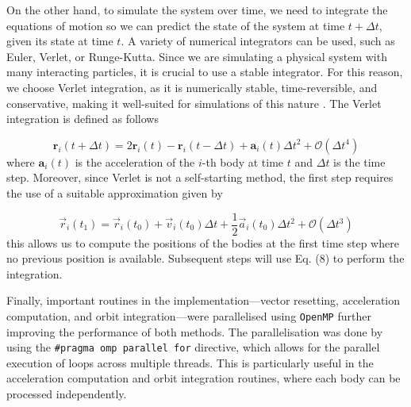 \documentclass[runningheads]{llncs}
\begin{document}
On the other hand, to simulate the system over time, we need to integrate the equations of motion so we can predict the state of the system at time $t+\Delta t$, given its state at time $t$. A variety of numerical integrators can be used, such as Euler, Verlet, or Runge-Kutta. Since we are simulating a physical system with many interacting particles, it is crucial to use a stable integrator. For this reason, we choose Verlet integration, as it is numerically stable, time-reversible, and conservative, making it well-suited for simulations of this nature \cite{book:8675}. The Verlet integration is defined as follows

\begin{equation}
  \mathbf{r}_i(t+\Delta t) = 2\mathbf{r}_i(t) - \mathbf{r}_i(t-\Delta t) + \mathbf{a}_i(t) \Delta t^2 + \mathcal{O}(\Delta t^4)
\end{equation}
where $\mathbf{a}_i(t)$ is the acceleration of the $i$-th body at time $t$ and $\Delta t$ is the time step. Moreover, since Verlet is not a self-starting method, the first step requires the use of a suitable approximation given by

\begin{equation}
  \vec{r}_i(t_1) = \vec{r}_i(t_0) + \vec{v}_i(t_0)\Delta t + \frac{1}{2} \vec{a}_i(t_0) \Delta t^2 + \mathcal{O}(\Delta t^3)
\end{equation}
this allows us to compute the positions of the bodies at the first time step where no previous position is available. Subsequent steps will use Eq. (8) to perform the integration. 

Finally, important routines in the implementation---vector resetting, acceleration computation, and orbit integration---were parallelised using \texttt{OpenMP} further improving the performance of both methods. The parallelisation was done by using the \texttt{#pragma omp parallel for} directive, which allows for the parallel execution of loops across multiple threads. This is particularly useful in the acceleration computation and orbit integration routines, where each body can be processed independently.

\end{document}
